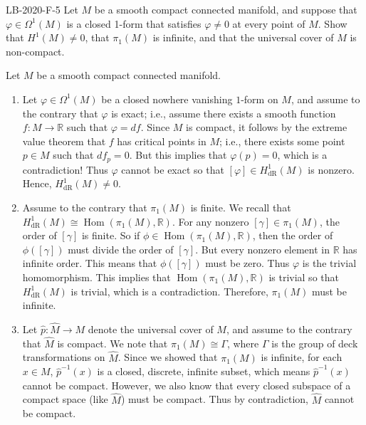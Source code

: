 \documentclass{article}
\begin{document}
	\begin{prb}{LB-2020-F-5}
		Let $M$ be a smooth compact connected manifold, and suppose that $\varphi \in \Omega^{1}(M)$ is a closed 1-form that satisfies $\varphi \neq 0$ at every point of $M$. Show that $H^{1}(M) \neq 0$, that $\pi_{1}(M)$ is infinite, and that the universal cover of $M$ is non-compact. 
	\end{prb}
	Let $M$ be a smooth compact connected manifold. 
	\begin{enumerate}[itemsep =-2pt,label = (\arabic{*})]
		\item Let $\varphi \in \Omega^{1}(M)$ be a closed nowhere vanishing $1$-form on $M$, and assume to the contrary that $\varphi$ is exact; i.e., assume there exists a smooth function $f: M \to \mathbb{R}$ such that $\varphi = df$. Since $M$ is compact, it follows by the extreme value theorem that $f$ has critical points in $M$; i.e., there exists some point $p \in M$ such that $df_{p} = 0$. But this implies that $\varphi(p) = 0$, which is a contradiction! Thus $\varphi$ cannot be exact so that $[\varphi] \in H^{1}_{\text{dR}}(M)$ is nonzero. Hence, $H^{1}_{\text{dR}}(M) \neq 0$. 
		\item Assume to the contrary that $\pi_{1}(M)$ is finite. We recall that $H^{1}_{\text{dR}}(M) \cong \operatorname{Hom}(\pi_{1}(M), \mathbb{R})$. For any nonzero $[\gamma] \in \pi_{1}(M)$, the order of $[\gamma]$ is finite. So if $\phi \in \operatorname{Hom}(\pi_{1}(M), \mathbb{R})$, then the order of $\phi([\gamma])$ must divide the order of $[\gamma]$. But every nonzero element in $\mathbb{R}$ has infinite order. This means that $\phi([\gamma])$ must be zero. Thus $\varphi$ is the trivial homomorphism. This implies that $\operatorname{Hom}(\pi_{1}(M), \mathbb{R})$ is trivial so that $H^{1}_{\text{dR}}(M)$ is trivial, which is a contradiction. Therefore, $\pi_{1}(M)$ must be infinite. 
		\item Let $\hat{p}: \hat{M} \to M$ denote the universal cover of $M$, and assume to the contrary that $\hat{M}$ is compact. We note that $\pi_{1}(M) \cong \Gamma$, where $\Gamma$ is the group of deck transformations on $\hat{M}$. Since we showed that $\pi_{1}(M)$ is infinite, for each $x \in M$, $\hat{p}^{-1}(x)$ is a closed, discrete, infinite subset, which means $\hat{p}^{-1}(x)$ cannot be compact. However, we also know that every closed subspace of a compact space (like $\hat{M}$) must be compact. Thus by contradiction, $\hat{M}$ cannot be compact. 
	\end{enumerate}
\end{document}
